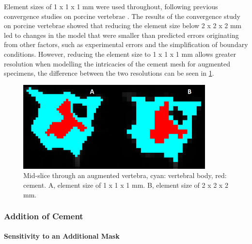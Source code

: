 Element sizes of 1 x 1 x 1 mm were used throughout, following previous
convergence studies on porcine vertebrae \cite{Jones2007}. The
results of the convergence study on porcine vertebrae showed that reducing the element
size below 2 x 2 x 2 mm led to changes in the model that were smaller
than predicted errors originating from other factors, such as
experimental errors and the simplification of boundary conditions.
However, reducing the element size to 1 x 1 x 1 mm allows greater
resolution when modelling the intricacies of the cement mesh for
augmented specimens, the difference between the two resolutions can be
seen in \cref{fig:vertslice}.

\begin{figure}[ht!]

\centering
\includegraphics[width=3.90994in,height=1.80208in]{images/res_comp.png}
\caption{Mid-slice through an augmented vertebra, cyan: vertebral body, red:
cement. A, element size of 1 x 1 x 1 mm. B, element size of 2 x 2 x
2 mm.}
\label{fig:vertslice}
\end{figure}

\subsubsection{Addition of Cement}\label{addition-of-cement}

\paragraph{Sensitivity to an Additional
Mask}\label{sensitivity-to-an-additional-mask}

